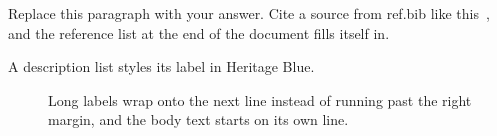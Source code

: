 
Replace this paragraph with your answer. Cite a source from ref.bib
like this~\cite{lamport1994}, and the reference list at the end of the
document fills itself in.

\begin{description}
  \item[A description list styles its label in Heritage Blue.]
    Long labels wrap onto the next line instead of running past the
    right margin, and the body text starts on its own line.
\end{description}
